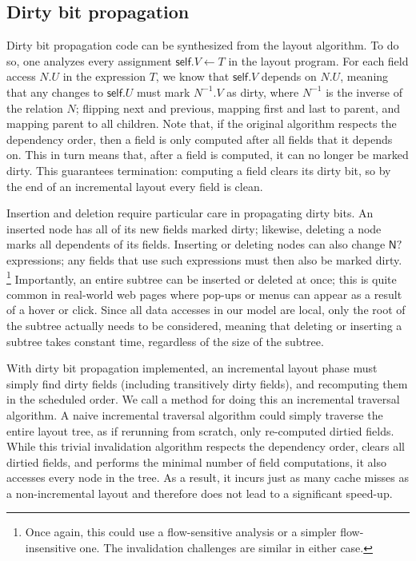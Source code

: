 \subsection{Dirty bit propagation}

Dirty bit propagation code
  can be synthesized from the layout algorithm.
To do so, one analyzes every assignment $\mathsf{self}.V \gets T$
  in the layout program.
For each field access $N.U$ in the expression $T$,
  we know that $\mathsf{self}.V$ depends on $N.U$,
  meaning that any changes to $\mathsf{self}.U$
  must mark $N^{-1}.V$ as dirty,
  where $N^{-1}$ is the inverse of the relation $N$;
  flipping \textsf{next} and \textsf{previous},
  mapping \textsf{first} and \textsf{last} to \textsf{parent},
  and mapping \textsf{parent} to all children.
Note that, if the original algorithm respects the dependency order,
  then a field is only computed after all fields that it depends on.
This in turn means that, after a field is computed,
  it can no longer be marked dirty.
This guarantees termination:
  computing a field clears its dirty bit, so by the end of an incremental layout
  every field is clean.

Insertion and deletion require particular care
  in propagating dirty bits.
An inserted node has all of its new fields marked dirty;
  likewise, deleting a node marks all dependents of its fields.
Inserting or deleting nodes can also change
  $\mathsf{N?}$ expressions;
  any fields that use such expressions must then
  also be marked dirty.%
\footnote{Once again,
  this could use a flow-sensitive analysis or a simpler
  flow-insensitive one.
The invalidation challenges are similar in either case.}
Importantly, an entire subtree can be inserted or deleted at once;
  this is quite common in real-world web pages
  where pop-ups or menus can appear as a result of a hover or click.
Since all data accesses in our model are local,
  only the root of the subtree actually needs to be considered,
  meaning that deleting or inserting a subtree takes constant time,
  regardless of the size of the subtree.

With dirty bit propagation implemented,
  an incremental layout phase must simply 
  find dirty fields (including transitively dirty fields),
  and recomputing them in the scheduled order.
We call a method for doing this an incremental traversal algorithm.
A naive incremental traversal algorithm
  could simply traverse the entire layout tree, 
  as if rerunning from scratch, only re-computed dirtied fields. 
While this trivial invalidation algorithm
  respects the dependency order, clears all dirtied fields,
  and performs the minimal number of field computations,
  it also accesses every node in the tree.
As a result, it incurs
  just as many cache misses as a non-incremental layout
  and therefore does not lead to a significant speed-up.

